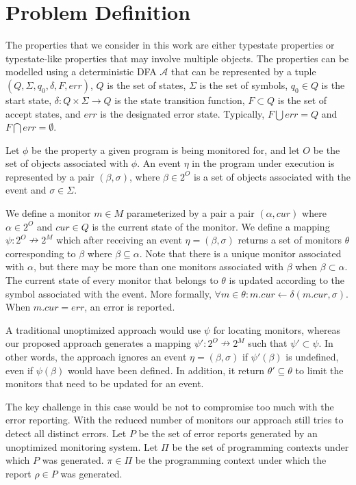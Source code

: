 \section{Problem Definition}
\label{sec:definition}

The properties that we consider in this work are either typestate properties or
typestate-like properties that may involve multiple objects. The properties
can be modelled using a deterministic DFA $\mathcal{A}$
that can be represented by a tuple $(Q, \Sigma, q_0, \delta, F, err)$, $Q$ is the set of states,
$\Sigma$ is the set of symbols, $q_0 \in Q$ is the start state, $\delta : Q \times \Sigma \to Q$ is the state transition
function, $F \subset Q$ is the set of accept states, and $err$ is the designated error state. Typically, 
$F \bigcup err = Q$ and $F \bigcap err = \emptyset$.

Let $\phi$ be the property a given program is being monitored for, and let
$O$ be the set of objects associated with $\phi$.  An event $\eta$ in the program
under execution is represented by a pair $(\beta, \sigma)$,
where $\beta \in 2^O$ is a set of objects associated with the event and $\sigma \in \Sigma$.

We define a monitor $m \in M$ parameterized by a pair a pair $(\alpha, cur)$ where $\alpha \in 2^O$ and
$cur \in Q$ is the current state of the monitor. We define a mapping $\psi : 2^O \nrightarrow 2^M$ which after receiving an event
$\eta = (\beta, \sigma)$ returns a set of monitors $\theta$
corresponding to $\beta$ where $\beta \subseteq \alpha$. Note that there is a unique monitor associated
with $\alpha$, but there may be more than one monitors associated with $\beta$ when $\beta \subset \alpha$.
The current state of every monitor that belongs to
$\theta$ is updated according to the symbol associated with the event. More formally,
$\forall m \in \theta: m.cur \leftarrow \delta(m.cur, \sigma)$. When $m.cur = err$, an error is reported.

A traditional unoptimized approach would use $\psi$ for locating monitors, whereas our proposed approach
generates a mapping $\psi': 2^O \nrightarrow 2^M$ such that $\psi' \subset \psi$.
In other words, the approach ignores an event $\eta = (\beta, \sigma)$ if $\psi'(\beta)$ is undefined, even if
$\psi(\beta)$ would have been defined. In addition, it return $\theta' \subseteq \theta$ to limit the monitors
that need to be updated for an event.

The key challenge in this case would be not to compromise too much with the error reporting. With the reduced
number of monitors our approach still tries to detect all distinct errors. Let $P$ be the set of error reports
generated by an unoptimized monitoring system. Let $\Pi$ be the set of programming contexts under which
$P$ was generated. $\pi \in \Pi$ be the programming context under which the report $\rho \in P$ was generated.

